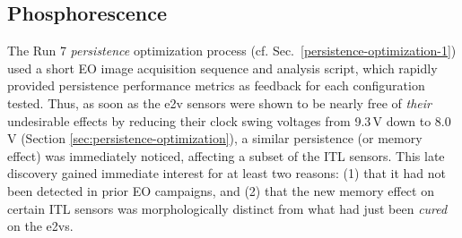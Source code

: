 %
%
%

%


\clearpage

\subsection{Phosphorescence}\label{phosphorescence}

The Run 7 {\it persistence} optimization process (cf. Sec.~\ref{persistence-optimization-1}) used a short EO image acquisition sequence and analysis script, which rapidly provided persistence performance metrics as feedback for each configuration tested. Thus, as soon as the e2v sensors were shown to be nearly free of {\it their} undesirable effects by reducing their clock swing voltages from 9.3\,V down to 8.0\,V (Section \ref{sec:persistence-optimization}), a similar persistence (or memory effect) was immediately noticed, affecting a subset of the ITL sensors. This late discovery gained immediate interest for at least two reasons: (1) that it had not been detected in prior EO campaigns, and (2) that the new memory effect on certain ITL sensors was morphologically distinct from what had just been {\it cured} on the e2vs. 

